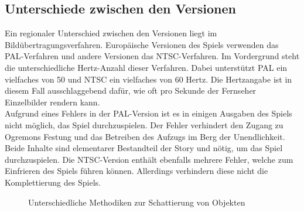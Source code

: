 \subsection{Unterschiede zwischen den Versionen}
Ein regionaler Unterschied zwischen den Versionen liegt im Bildübertragungsverfahren. Europäische Versionen des Spiels verwenden das \ac{PAL}-Verfahren und andere Versionen das \ac{NTSC}-Verfahren. Im Vordergrund steht die unterschiedliche Hertz-Anzahl dieser Verfahren.
Dabei unterstützt  \ac{PAL} ein vielfaches von 50 und \ac{NTSC} ein vielfaches von 60 Hertz\cite{pal-vs-ntsc}. Die Hertzangabe ist in diesem Fall ausschlaggebend dafür, wie oft pro Sekunde der Fernseher Einzelbilder rendern kann.\\

Aufgrund eines Fehlers in der \ac{PAL}-Version ist es in einigen Ausgaben des Spiels nicht möglich, das Spiel durchzuspielen. Der Fehler verhindert den Zugang zu Ogremons Festung und das Betreiben des Aufzugs im Berg der Unendlichkeit\cite{epicplay}. Beide Inhalte sind elementarer Bestandteil der Story und nötig, um das Spiel durchzuspielen. Die \ac{NTSC}-Version enthält ebenfalls mehrere Fehler, welche zum Einfrieren des Spiels führen können\cite{gamefaqglitch}. Allerdings verhindern diese nicht die Komplettierung des Spiels.\\

\begin{figure}[H]%
    \centering
    \qquad
    \caption{Unterschiedliche Methodiken zur Schattierung von Objekten}%
    \label{fig:dw1-shadow}%
\end{figure}

